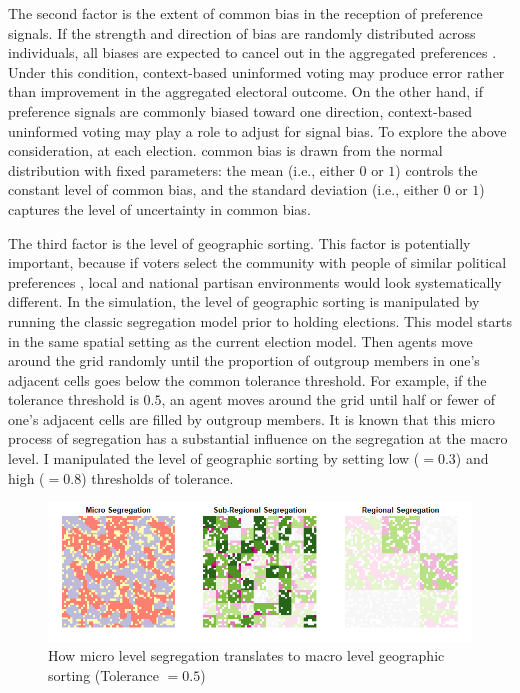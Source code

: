 \documentclass[letterpaper, 12pt]{article}
\begin{document}
    \par The second factor is the extent of common bias in the reception of preference signals. If the strength and direction of bias are randomly distributed across individuals, all biases are expected to cancel out in the aggregated preferences \citep{Page1992thra}. Under this condition, context-based uninformed voting may produce error rather than improvement in the aggregated electoral outcome. On the other hand, if preference signals are commonly biased toward one direction, context-based uninformed voting may play a role to adjust for signal bias. To explore the above consideration, at each election. common bias is drawn from the normal distribution with fixed parameters: the mean (i.e., either $0$ or $1$) controls the constant level of common bias, and the standard deviation (i.e., either $0$ or $1$) captures the level of uncertainty in common bias.
    
    \par The third factor is the level of geographic sorting. This factor is potentially important, because if voters select the community with people of similar political preferences \citep{TamCho2013vomi}, local and national partisan environments would look systematically different. In the simulation, the level of geographic sorting is manipulated by running the classic segregation model \citep{Schelling1969moof} prior to holding elections. This model starts in the same spatial setting as the current election model. Then agents move around the grid randomly until the proportion of outgroup members in one's adjacent cells goes below the common tolerance threshold. For example, if the tolerance threshold is $0.5$, an agent moves around the grid until half or fewer of one's adjacent cells are filled by outgroup members. It is known that this micro process of segregation has a substantial influence on the segregation at the macro level. I manipulated the level of geographic sorting by setting low ($=0.3$) and high ($=0.8$) thresholds of tolerance.
    
    \begin{figure}[t!]
        \caption{How micro level segregation translates to macro level geographic sorting (Tolerance $=0.5$)}
        \label{fig:abmexample}
        \includegraphics[width=\linewidth]{../outputs/abm_segregation_example.png}
    \end{figure}
\end{document}
